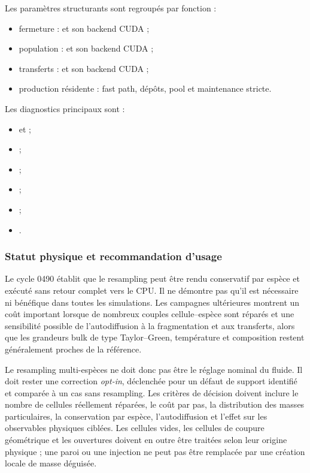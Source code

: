 \documentclass[11pt,a4paper]{article}
\begin{document}
Les paramètres structurants sont regroupés par fonction :
\begin{itemize}[nosep]
  \item fermeture :  et son backend CUDA ;
  \item population :  et son backend CUDA ;
  \item transferts :  et son backend CUDA ;
  \item production résidente : fast path, dépôts, pool et maintenance stricte.
\end{itemize}
Les diagnostics principaux sont :
\begin{itemize}[nosep]
  \item {} et  ;
  \item {} ;
  \item {} ;
  \item {} ;
  \item {} ;
  \item {}.
\end{itemize}

\subsubsection{Statut physique et recommandation d'usage}

Le cycle 0490 établit que le resampling peut être rendu conservatif par espèce et exécuté sans retour complet vers le CPU. Il ne démontre pas qu'il est nécessaire ni bénéfique dans toutes les simulations. Les campagnes ultérieures montrent un coût important lorsque de nombreux couples cellule--espèce sont réparés et une sensibilité possible de l'autodiffusion à la fragmentation et aux transferts, alors que les grandeurs bulk de type Taylor--Green, température et composition restent généralement proches de la référence.

Le resampling multi-espèces ne doit donc pas être le réglage nominal du fluide. Il doit rester une correction \emph{opt-in}, déclenchée pour un défaut de support identifié et comparée à un cas sans resampling. Les critères de décision doivent inclure le nombre de cellules réellement réparées, le coût par pas, la distribution des masses particulaires, la conservation par espèce, l'autodiffusion et l'effet sur les observables physiques ciblées. Les cellules vides, les cellules de coupure géométrique et les ouvertures doivent en outre être traitées selon leur origine physique ; une paroi ou une injection ne peut pas être remplacée par une création locale de masse déguisée.
\end{document}
